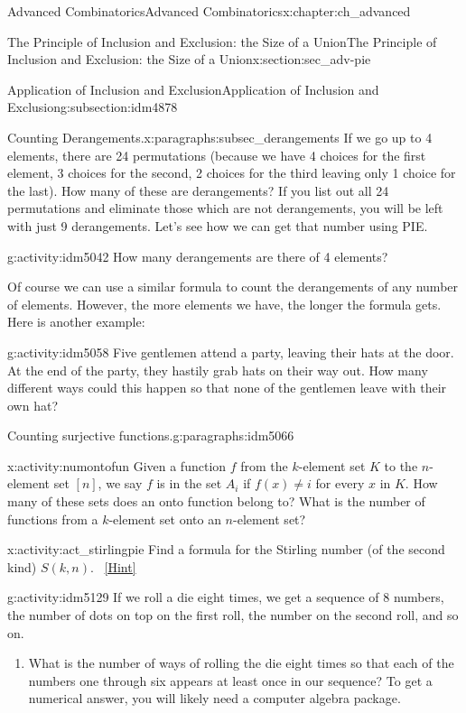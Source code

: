 \documentclass[oneside,10pt,]{book}
\numberwithin{equation}{chapter}
\begin{document}
\begin{chapterptx}{Advanced Combinatorics}{}{Advanced Combinatorics}{}{}{x:chapter:ch_advanced}
\begin{sectionptx}{The Principle of Inclusion and Exclusion: the Size of a Union}{}{The Principle of Inclusion and Exclusion: the Size of a Union}{}{}{x:section:sec_adv-pie}
\begin{subsectionptx}{Application of Inclusion and Exclusion}{}{Application of Inclusion and Exclusion}{}{}{g:subsection:idm4878}
\begin{paragraphs}{Counting Derangements.}{x:paragraphs:subsec_derangements}
If we go up to 4 elements, there are 24 permutations (because we have 4 choices for the first element, 3 choices for the second, 2 choices for the third leaving only 1 choice for the last). How many of these are derangements? If you list out all 24 permutations and eliminate those which are not derangements, you will be left with just 9 derangements. Let's see how we can get that number using PIE.%
\begin{activity}{}{g:activity:idm5042}%
How many derangements are there of 4 elements?%
\end{activity}
Of course we can use a similar formula to count the derangements of any number of elements. However, the more elements we have, the longer the formula gets. Here is another example:%
\begin{activity}{}{g:activity:idm5058}%
Five gentlemen attend a party, leaving their hats at the door. At the end of the party, they hastily grab hats on their way out. How many different ways could this happen so that none of the gentlemen leave with their own hat?%
\end{activity}
\end{paragraphs}%
\begin{paragraphs}{Counting surjective functions.}{g:paragraphs:idm5066}%
\begin{activity}{}{x:activity:numontofun}%
Given a function \(f\) from the \(k\)-element set \(K\) to the \(n\)-element set \([n]\), we say \(f\) is in the set \(A_i\) if \(f(x)\not= i\) for every \(x\) in \(K\). How many of these  sets does an onto function belong to? What is the number of functions from a \(k\)-element set onto an \(n\)-element set?%
\end{activity}
\begin{activity}{}{x:activity:act_stirlingpie}%
Find a formula for the Stirling number (of the second kind) \(S(k,n)\).%
\qquad~\hfill{\tiny\hyperlink{g:hint:idm5119-back}{[Hint]}}\end{activity}
\begin{activity}{}{g:activity:idm5129}%
If we roll a die eight times, we get a sequence of 8 numbers, the number of dots on top on the first roll, the number on the second roll, and so on.%
\begin{enumerate}[font=\bfseries,label=(\alph*),ref=\alph*]
\item{}What is the number of ways of rolling the die eight times so that each of the numbers one through six appears at least once in our sequence? To get a numerical answer, you will likely need a computer algebra package.%

\end{enumerate}
\end{activity}
\end{paragraphs}
\end{subsectionptx}
\end{sectionptx}
\end{chapterptx}
\end{document}

